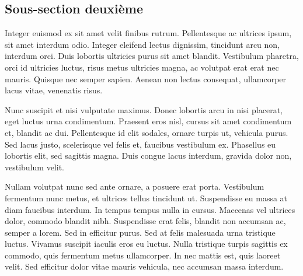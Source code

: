\documentclass{heh-fiche}
\begin{document}
\subsection{Sous-section deuxième}

Integer euismod ex sit amet velit finibus rutrum. Pellentesque ac ultrices ipsum, sit amet interdum odio. Integer eleifend lectus dignissim, tincidunt arcu non, interdum orci. Duis lobortis ultricies purus sit amet blandit. Vestibulum pharetra, orci id ultricies luctus, risus metus ultricies magna, ac volutpat erat erat nec mauris. Quisque nec semper sapien. Aenean non lectus consequat, ullamcorper lacus vitae, venenatis risus.

Nunc suscipit et nisi vulputate maximus. Donec lobortis arcu in nisi placerat, eget luctus urna condimentum. Praesent eros nisl, cursus sit amet condimentum et, blandit ac dui. Pellentesque id elit sodales, ornare turpis ut, vehicula purus. Sed lacus justo, scelerisque vel felis et, faucibus vestibulum ex. Phasellus eu lobortis elit, sed sagittis magna. Duis congue lacus interdum, gravida dolor non, vestibulum velit.

Nullam volutpat nunc sed ante ornare, a posuere erat porta. Vestibulum fermentum nunc metus, et ultrices tellus tincidunt ut. Suspendisse eu massa at diam faucibus interdum. In tempus tempus nulla in cursus. Maecenas vel ultrices dolor, commodo blandit nibh. Suspendisse erat felis, blandit non accumsan ac, semper a lorem. Sed in efficitur purus. Sed at felis malesuada urna tristique luctus. Vivamus suscipit iaculis eros eu luctus. Nulla tristique turpis sagittis ex commodo, quis fermentum metus ullamcorper. In nec mattis est, quis laoreet velit. Sed efficitur dolor vitae mauris vehicula, nec accumsan massa interdum.
\end{document}
